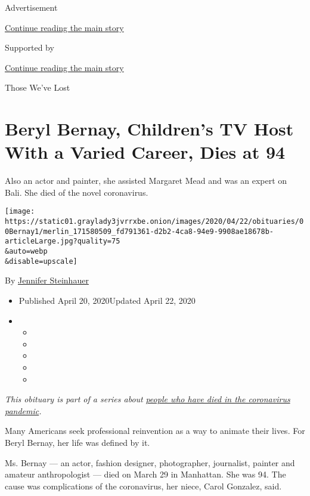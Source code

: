 Advertisement

\protect\hyperlink{after-top}{Continue reading the main story}

Supported by

\protect\hyperlink{after-sponsor}{Continue reading the main story}

Those We've Lost

\hypertarget{beryl-bernay-childrens-tv-host-with-a-varied-career-dies-at-94}{%
\section{Beryl Bernay, Children's TV Host With a Varied Career, Dies at
94}\label{beryl-bernay-childrens-tv-host-with-a-varied-career-dies-at-94}}

Also an actor and painter, she assisted Margaret Mead and was an expert
on Bali. She died of the novel coronavirus.

\texttt{[image: https://static01.graylady3jvrrxbe.onion/images/2020/04/22/obituaries/00Bernay1/merlin\_171580509\_fd791361-d2b2-4ca8-94e9-9908ae18678b-articleLarge.jpg?quality=75\\\&auto=webp\\\&disable=upscale]}

By
\href{https://www.nytimes3xbfgragh.onion/by/jennifer-steinhauer}{Jennifer
Steinhauer}

\begin{itemize}
\item
  Published April 20, 2020Updated April 22, 2020
\item
  \begin{itemize}
  \item
  \item
  \item
  \item
  \item
  \end{itemize}
\end{itemize}

\emph{This obituary is part of a series about}
\href{https://www.nytimes3xbfgragh.onion/series/people-who-have-died-of-the-coronavirus}{\emph{people
who have died in the coronavirus pandemic}}\emph{.}

Many Americans seek professional reinvention as a way to animate their
lives. For Beryl Bernay, her life was defined by it.

Ms. Bernay --- an actor, fashion designer, photographer, journalist,
painter and amateur anthropologist --- died on March 29 in Manhattan.
She was 94. The cause was complications of the coronavirus, her niece,
Carol Gonzalez, said.

